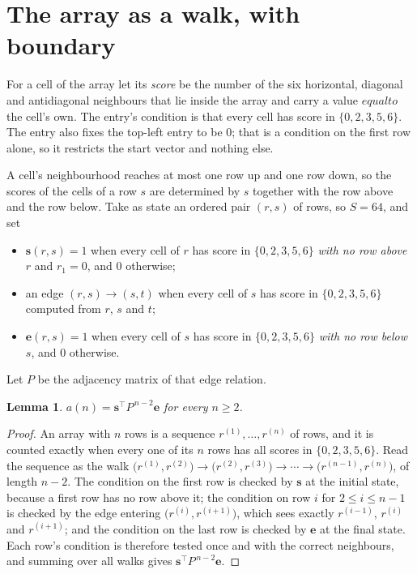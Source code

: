 \documentclass[11pt,a4paper]{article}
\theoremstyle{plain}
\newtheorem{lemma}[theorem]{Lemma}
\theoremstyle{definition}
\begin{document}
\section{The array as a walk, with boundary}

For a cell of the array let its \emph{score} be the number of the six horizontal, diagonal and antidiagonal neighbours that lie inside
the array and carry a value $equal to$ the cell's own. The entry's condition is that every cell
has score in $\{0,2,3,5,6\}$. The entry also fixes the top-left entry to be $0$; that is a condition on the first row alone, so it restricts the start vector and nothing else.

A cell's neighbourhood reaches at most one row up and one row down, so the scores of the
cells of a row $s$ are determined by $s$ together with the row above and the row below.
Take as state an ordered pair $(r,s)$ of rows, so $S=64$, and set
\begin{itemize}
\item $\mathbf{s}(r,s)=1$ when every cell of $r$ has score in $\{0,2,3,5,6\}$ \emph{with no row
above $r$} and $r_1=0$, and $0$ otherwise;
\item an edge $(r,s)\to(s,t)$ when every cell of $s$ has score in $\{0,2,3,5,6\}$ computed from
$r$, $s$ and $t$;
\item $\mathbf{e}(r,s)=1$ when every cell of $s$ has score in $\{0,2,3,5,6\}$ \emph{with no row
below $s$}, and $0$ otherwise.
\end{itemize}
Let $P$ be the adjacency matrix of that edge relation.

\begin{lemma}\label{lem:walk}
$a(n)=\mathbf{s}^{\!\top}P^{\,n-2}\mathbf{e}$ for every $n\ge2$.
\end{lemma}

\begin{proof}
An array with $n$ rows is a sequence $r^{(1)},\dots,r^{(n)}$ of rows, and it is counted
exactly when every one of its $n$ rows has all scores in $\{0,2,3,5,6\}$. Read the sequence as the
walk $\bigl(r^{(1)},r^{(2)}\bigr)\to\bigl(r^{(2)},r^{(3)}\bigr)\to\cdots\to
\bigl(r^{(n-1)},r^{(n)}\bigr)$, of length $n-2$. The condition on the first row is
checked by $\mathbf{s}$ at the initial state, because a first row has no row above it; the
condition on row $i$ for $2\le i\le n-1$ is checked by the edge entering
$\bigl(r^{(i)},r^{(i+1)}\bigr)$, which sees exactly $r^{(i-1)}$, $r^{(i)}$ and
$r^{(i+1)}$; and the condition on the last row is checked by $\mathbf{e}$ at the final
state. Each row's condition is therefore tested once and with the correct neighbours, and
summing over all walks gives $\mathbf{s}^{\!\top}P^{\,n-2}\mathbf{e}$.
\end{proof}
\end{document}

